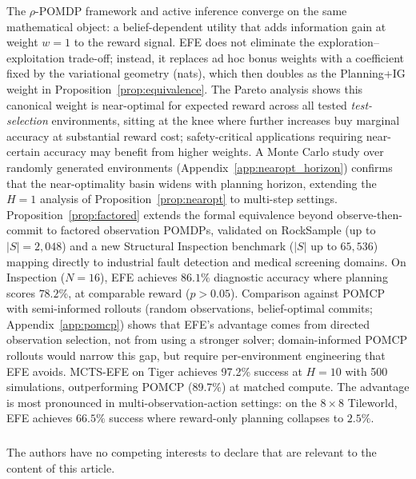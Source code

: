 \documentclass[runningheads]{llncs}
\begin{document}
The $\rho$-POMDP framework and active inference converge on the same mathematical object: a belief-dependent utility that adds information gain at weight $w{=}1$ to the reward signal. EFE does not eliminate the exploration--exploitation trade-off; instead, it replaces ad hoc bonus weights with a coefficient fixed by the variational geometry (nats), which then doubles as the Planning+IG weight in Proposition~\ref{prop:equivalence}. The Pareto analysis shows this canonical weight is near-optimal for expected reward across all tested \emph{test-selection} environments, sitting at the knee where further increases buy marginal accuracy at substantial reward cost; safety-critical applications requiring near-certain accuracy may benefit from higher weights. A Monte Carlo study over randomly generated environments (Appendix~\ref{app:nearopt_horizon}) confirms that the near-optimality basin widens with planning horizon, extending the $H{=}1$ analysis of Proposition~\ref{prop:nearopt} to multi-step settings. Proposition~\ref{prop:factored} extends the formal equivalence beyond observe-then-commit to factored observation POMDPs, validated on RockSample (up to $|S|{=}2{,}048$) and a new Structural Inspection benchmark ($|S|$ up to $65{,}536$) mapping directly to industrial fault detection and medical screening domains. On Inspection ($N{=}16$), EFE achieves $86.1\%$ diagnostic accuracy where planning scores $78.2\%$, at comparable reward ($p > 0.05$). Comparison against POMCP with semi-informed rollouts (random observations, belief-optimal commits; Appendix~\ref{app:pomcp}) shows that EFE's advantage comes from directed observation selection, not from using a stronger solver; domain-informed POMCP rollouts would narrow this gap, but require per-environment engineering that EFE avoids. MCTS-EFE on Tiger achieves 97.2\% success at $H{=}10$ with 500 simulations, outperforming POMCP (89.7\%) at matched compute. The advantage is most pronounced in multi-observation-action settings: on the $8{\times}8$ Tileworld, EFE achieves $66.5\%$ success where reward-only planning collapses to $2.5\%$.

\begin{credits}
\subsubsection{\discintname}
The authors have no competing interests to declare that are relevant to the content of this article.
\end{credits}
\end{document}
